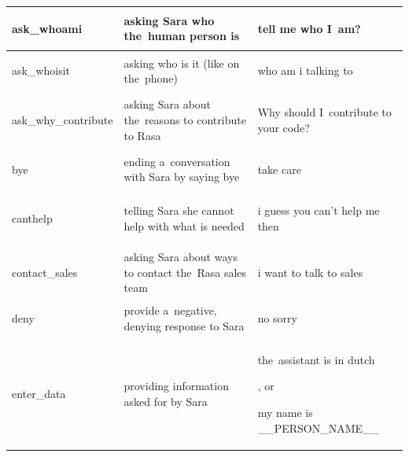 \documentclass[bsc,frontabs,singlespacing,parskip,deptreport]{infthesis}
\begin{document}
{\begin{center}
\begin{longtable}{p{}|p{}|p{}}
    \hline
    \begin{spverbatim}ask_whoami\end{spverbatim} & asking Sara who the~human person is & \begin{spverbatim}tell me who I~am?\end{spverbatim} \\
    \hline
    \begin{spverbatim}ask_whoisit\end{spverbatim} & asking who is it (like on the~phone) & \begin{spverbatim}who am i talking to\end{spverbatim} \\
    \hline
    \begin{spverbatim}ask_why_contribute\end{spverbatim} & asking Sara about the~reasons to contribute to Rasa & \begin{spverbatim}Why should I~contribute to your code?\end{spverbatim} \\
    \hline
    \begin{spverbatim}bye\end{spverbatim} & ending a~conversation with Sara by saying bye & \begin{spverbatim}take care\end{spverbatim} \\
    \hline
    \begin{spverbatim}canthelp\end{spverbatim} & telling Sara she cannot help with what is needed & \begin{spverbatim}i guess you can't help me then\end{spverbatim} \\
    \hline
    \begin{spverbatim}contact_sales\end{spverbatim} & asking Sara about ways to contact the~Rasa sales team & \begin{spverbatim}i want to talk to sales\end{spverbatim} \\
    \hline
    \begin{spverbatim}deny\end{spverbatim} & provide a~negative, denying response to Sara & \begin{spverbatim}no sorry\end{spverbatim} \\
    \hline
    \begin{spverbatim}enter_data\end{spverbatim} & providing information asked for by Sara & \begin{spverbatim}the~assistant is in dutch\end{spverbatim}, or \begin{spverbatim}my name is __PERSON_NAME__\end{spverbatim} \\

\end{longtable}
\end{center}}
\end{document}
